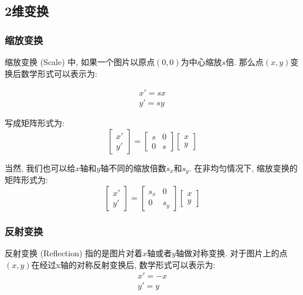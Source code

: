 \subsection{2维变换}

\subsubsection{缩放变换}

缩放变换 (Scale) 中, 如果一个图片以原点$(0,0)$为中心缩放$s$倍. 那么点$(x,y)$变换后数学形式可以表示为: 

\begin{equation}
\begin{split}
	x'=sx
	\\
	y'=sy
\end{split}
\end{equation}

写成矩阵形式为: 
\begin{equation}
	\begin{bmatrix}
		x' \\
		y'
	\end{bmatrix} = \begin{bmatrix}
		s&0\\0&s\end{bmatrix}\begin{bmatrix}x\\y\end{bmatrix}
\end{equation}

当然, 我们也可以给$x$轴和$y$轴不同的缩放倍数$s_x$和$s_y$. 在非均匀情况下, 缩放变换的矩阵形式为: 
\begin{equation}
	\begin{bmatrix}
		x' \\
		y'
	\end{bmatrix} = \begin{bmatrix}
		s_x&0\\0&s_y\end{bmatrix}\begin{bmatrix}x\\y\end{bmatrix}
\end{equation}

\subsubsection{反射变换}

反射变换 (Reflection) 指的是图片对着$x$轴或者$y$轴做对称变换. 对于图片上的点$(x,y)$在经过x轴的对称反射变换后, 数学形式可以表示为: 
\begin{equation}
	\begin{split}
		x'=-x\\y'=y
	\end{split}
\end{equation}

